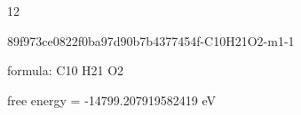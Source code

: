 \documentclass{article}
\begin{document}
12

\vspace{1cm}


89f973ce0822f0ba97d90b7b4377454f-C10H21O2-m1-1



formula: C10 H21 O2



free energy = -14799.207919582419 eV
\end{document}
